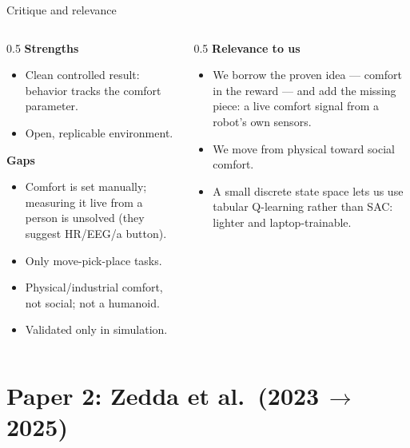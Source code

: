 \documentclass[aspectratio=169,10pt]{beamer}
\begin{document}
\begin{frame}{Critique and relevance}
  \begin{columns}[T]
    \begin{column}{0.5\textwidth}
      \textbf{Strengths}
      \begin{itemize}\footnotesize
        \item Clean controlled result: behavior tracks the comfort parameter.
        \item Open, replicable environment.
      \end{itemize}
      \textbf{Gaps}
      \begin{itemize}\footnotesize
        \item Comfort is set manually; measuring it live from a person is unsolved (they suggest HR/EEG/a button).
        \item Only move-pick-place tasks.
        \item Physical/industrial comfort, not social; not a humanoid.
        \item Validated only in simulation.
      \end{itemize}
    \end{column}
    \begin{column}{0.5\textwidth}
      \textbf{Relevance to us}
      \begin{itemize}\footnotesize
        \item We borrow the proven idea --- comfort in the reward --- and add the missing piece: a live comfort signal from a robot's own sensors.
        \item We move from physical toward social comfort.
        \item A small discrete state space lets us use tabular Q-learning rather than SAC: lighter and laptop-trainable.
      \end{itemize}
    \end{column}
  \end{columns}
\end{frame}

\section{Paper 2: Zedda et al.\ (2023\,$\to$\,2025)}
 
\end{document}
